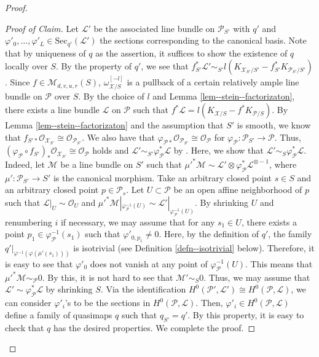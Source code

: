 \documentclass[12pt,twoside]{amsart}
\theoremstyle{definition}
\begin{document}
\begin{proof}
\begin{proof}[Proof of Claim]   
Let $\mathscr{L}'$ be the associated line bundle on $\mathcal{P}_{S'}$ with $q'$ and $\varphi'_0,\ldots,\varphi'_{L}\in\mathrm{Sec}_{q'}(\mathscr{L}')$ the sections corresponding to the canonical basis.
Note that by uniqueness of $q$ as the assertion, it suffices to show the existence of $q$ locally over $S$.
    By the property of $q'$, we see that $f_{S'}^*\mathscr{L}'\sim_{S'}l(K_{\mathcal{X}_{S'}/S'}-f_{S'}^*K_{\mathcal{P}_{S'}/S'})$.
   Since $f\in \mathcal{M}_{d,v,u,r}(S)$, $\omega_{\mathcal{X}/S}^{[-l]}$ is a pullback of a certain relatively ample line bundle on $\mathcal{P}$ over $S$. 
    By the choice of $l$ and Lemma \ref{lem--stein--factorizaton}, there exists a line bundle $\mathscr{L}$ on $\mathcal{P}$ such that $f^*\mathscr{L}=l(K_{\mathcal{X}/S}-f^*K_{\mathcal{P}/S})$. 
    By Lemma \ref{lem--stein--factorizaton} and the assumption that $S'$ is smooth, we know that $f_{S'*}\mathcal{O}_{\mathcal{X}_{S'}}\cong \mathcal{O}_{\mathcal{P}_{S'}}$.
    We also have that $\varphi_{\mathcal{P}*}\mathcal{O}_{\mathcal{P}_{S'}}\cong\mathcal{O}_{\mathcal{P}}$ for $\varphi_{\mathcal{P}}\colon\mathcal{P}_{S'}\to \mathcal{P}$. 
    Thus, $(\varphi_{\mathcal{P}}\circ f_{S'})_*\mathcal{O}_{\mathcal{X}_{S'}}\cong \mathcal{O}_{\mathcal{P}}$ holds and $\mathscr{L}'\sim_{S'} \varphi_{\mathcal{P}}^*\mathscr{L}$ by \cite[Lemma 9.2.7]{FGA}.
    Here, we show that $\mathscr{L}'\sim_S\varphi_{\mathcal{P}}^*\mathscr{L}$.
    Indeed, let $\mathscr{M}$ be a line bundle on $S'$ such that $\mu'^*\mathscr{M}\sim\mathscr{L}'\otimes\varphi_{\mathcal{P}}^*\mathscr{L}^{\otimes -1}$, where $\mu'\colon \mathcal{P}_{S'}\to S'$ is the canonical morphism.
    Take an arbitrary closed point $s\in S$ and an arbitrary closed point $p\in \mathcal{P}_s$.
    Let $U\subset \mathcal{P}$ be an open affine neighborhood of $p$ such that $\mathscr{L}|_U\sim\mathcal{O}_U$ and $\mu'^*\mathscr{M}|_{\varphi_{\mathcal{P}}^{-1}(U)}\sim\mathscr{L}'|_{\varphi_{\mathcal{P}}^{-1}(U)}$.
    By shrinking $U$ and renumbering $i$ if necessary, we may assume that for any $s_1\in U$, there exists a point $p_1\in \varphi_{\mathcal{P}}^{-1}(s_1)$ such that $\varphi'_{0,p_1}\ne0$.
    Here, by the definition of $q'$, the family $q'|_{\varphi^{-1}(\varphi(\mu'(s_1)))}$ is isotrivial (see Definition \ref{defn--isotrivial} below).
    Therefore, it is easy to see that $\varphi'_0$ does not vanish at any point of $\varphi_{\mathcal{P}}^{-1}(U)$.
    This means that $\mu'^*\mathscr{M}\sim_{\mathcal{P}}0$.
    By this, it is not hard to see that $\mathscr{M}'\sim_S0$.
   Thus, we may assume that $\mathscr{L}'\sim\varphi_{\mathcal{P}}^*\mathscr{L}$ by shrinking $S$. 
    Via the identification $H^0(\mathcal{P}',\mathscr{L}')\cong H^0(\mathcal{P},\mathscr{L})$, we can consider $\varphi'_i$'s to be the sections in $H^0(\mathcal{P},\mathscr{L})$.
    Then, $\varphi'_i\in H^0(\mathcal{P},\mathscr{L})$ define a family of quasimaps $q$ such that $q_{S'}=q'$.
    By this property, it is easy to check that $q$ has the desired properties.
    We complete the proof. 
\end{proof}


\end{proof}
\end{document}
